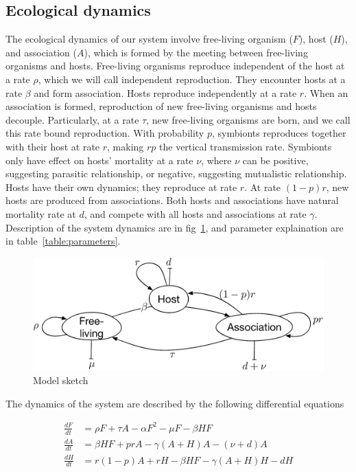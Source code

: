 \documentclass[11pt]{article}
\begin{document}
\subsection*{Ecological dynamics}

The ecological dynamics of our system involve free-living organism ($F$), host ($H$), and association ($A$), which is formed by the meeting between free-living organisms and hosts. Free-living organisms reproduce independent of the host at a rate $\rho$, which we will call independent reproduction. They encounter hosts at a rate $\beta$ and form association. Hosts reproduce independently at a rate $r$. When an association is formed, reproduction of new free-living organisms and hosts decouple. Particularly, at a rate $\tau$, new free-living organisms are born, and we call this rate bound reproduction. With probability $p$, symbionts reproduces together with their host at rate $r$, making $r p$ the vertical transmission rate. Symbionts only have effect on hosts' mortality at a rate $\nu$, where $\nu$ can be positive, suggesting parasitic relationship, or negative, suggesting mutualistic relationship. Hosts have their own dynamics; they reproduce at rate $r$. At rate $(1-p)r$, new hosts are produced from associations. Both hosts and associations have natural mortality rate at $d$, and compete with all hosts and associations at rate $\gamma$. Description of the system dynamics are in fig~\ref{Fig:model_sketch}, and  parameter explaination are in table~\ref{table:parameters}. 

\begin{figure}[ht!]
	\centering
	\includegraphics[width=0.7 \linewidth]{model_sketch}
	\caption{Model sketch}
	\label{Fig:model_sketch}
\end{figure}

The dynamics of the system are described by the following differential equations

\begin{align}
	\frac{dF}{dt}     & = \rho F +\tau A - \alpha F^2 - \mu F - \beta H F \\
	\frac{dA}{dt}    & = \beta H F +  p r A - \gamma (A + H) A - (\nu + d)  A \\
	\frac{dH}{dt}    & = r (1 - p) A + r  H -\beta H F   - \gamma (A + H) H - d H 
\end{align}
\end{document}
